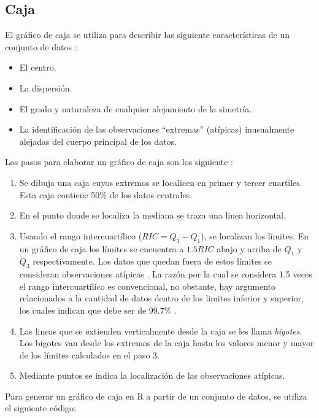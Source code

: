 \documentclass[
]{book}
\providecommand{\tightlist}{%
  \setlength{\itemsep}{0pt}\setlength{\parskip}{0pt}}
\begin{document}
\hypertarget{caja}{%
\subsection{Caja}\label{caja}}

El gráfico de caja se utiliza para describir las siguiente características de un conjunto de datos \citep[página 35]{Devore}:

\begin{itemize}
\tightlist
\item
  El centro.
\item
  La dispersión.
\item
  El grado y naturaleza de cualquier alejamiento de la simetría.
\item
  La identificación de las observaciones ``extremas'' (atípicas) inusualmente alejadas del cuerpo principal de los datos.
\end{itemize}

Los pasos para elaborar un gráfico de caja son los siguiente \citep[página 106]{anderson}:

\begin{enumerate}
\def\labelenumi{\arabic{enumi}.}
\tightlist
\item
  Se dibuja una caja cuyos extremos se localicen en primer y tercer cuartiles. Esta caja contiene 50\% de los datos centrales.
\item
  En el punto donde se localiza la mediana se traza una linea horizontal.
\item
  Usando el rango intercuartílico (\(RIC = Q_3-Q_1\)), se localizan los límites. En un gráfico de caja los límites se encuentra a \(1.5RIC\) abajo y arriba de \(Q_1\) y \(Q_3\) respectivamente. Los datos que quedan fuera de estos límites se consideran observaciones atípicas \citep{Tukey}. La razón por la cual se considera 1.5 veces el rango intercuartílico es convencional, no obstante, hay argumento relacionados a la cantidad de datos dentro de los limites inferior y superior, los cuales indican que debe ser de 99.7\% \citep{James2013}.
\item
  Las lineas que se extienden verticalmente desde la caja se les llama \emph{bigotes}. Los bigotes van desde los extremos de la caja hasta los valores menor y mayor de los límites calculados en el paso 3.
\item
  Mediante puntos se indica la localización de las observaciones atípicas.
\end{enumerate}

Para generar un gráfico de caja en R a partir de un conjunto de datos, se utiliza el siguiente código:
\end{document}
